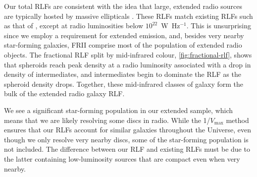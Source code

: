 \documentclass[11pt, a4paper]{book}
\begin{document}
      Our total RLFs are consistent with the idea that large, extended radio sources are typically hosted by massive ellipticals \citep{best05agn}. These RLFs match existing RLFs such as that of \citet{mauch07rlf}, except at radio luminosities below $10^{22}$~W~Hz$^{-1}$. This is unsurprising since we employ a requirement for extended emission, and, besides very nearby star-forming galaxies, FRII comprise most of the population of extended radio objects. The fractional RLF split by mid-infrared colour, \autoref{fig:fractional-rlf}, shows that spheroids reach peak density at a radio luminosity associated with a drop in density of intermediates, and intermediates begin to dominate the RLF as the spheroid density drops. Together, these mid-infrared classes of galaxy form the bulk of the extended radio galaxy RLF.

      We see a significant star-forming population in our extended sample, which means that we are likely resolving some discs in radio. While the 1/$V_{\max}$ method ensures that our RLFs account for similar galaxies throughout the Universe, even though we only resolve very nearby discs, some of the star-forming population is not included. The difference between our RLF and existing RLFs must be due to the latter containing low-luminosity sources that are compact even when very nearby.
\end{document}
